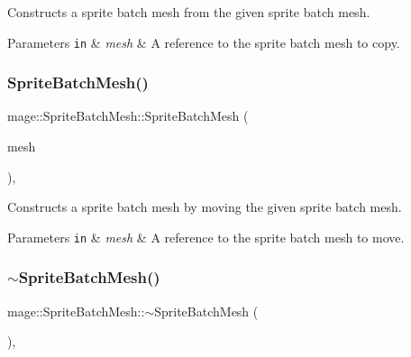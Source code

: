 Constructs a sprite batch mesh from the given sprite batch mesh.


\begin{DoxyParams}[1]{Parameters}
\mbox{\tt in}  & {\em mesh} & A reference to the sprite batch mesh to copy. \\
\hline
\end{DoxyParams}
\hypertarget{classmage_1_1_sprite_batch_mesh_a449601f328db56e11d93e9f4ecb1015b}{}\label{classmage_1_1_sprite_batch_mesh_a449601f328db56e11d93e9f4ecb1015b} 
\subsubsection{\texorpdfstring{Sprite\+Batch\+Mesh()}{SpriteBatchMesh()}\hspace{0.1cm}{\footnotesize\ttfamily [4/4]}}
{\footnotesize\ttfamily mage\+::\+Sprite\+Batch\+Mesh\+::\+Sprite\+Batch\+Mesh (\begin{DoxyParamCaption}\item[{\hyperlink{classmage_1_1_sprite_batch_mesh}{Sprite\+Batch\+Mesh} \&\&}]{mesh }\end{DoxyParamCaption})\hspace{0.3cm}{\ttfamily [default]}, {\ttfamily [noexcept]}}

Constructs a sprite batch mesh by moving the given sprite batch mesh.


\begin{DoxyParams}[1]{Parameters}
\mbox{\tt in}  & {\em mesh} & A reference to the sprite batch mesh to move. \\
\hline
\end{DoxyParams}
\hypertarget{classmage_1_1_sprite_batch_mesh_a4f9ad5d0d58722499b9e7ddfac3312c9}{}\label{classmage_1_1_sprite_batch_mesh_a4f9ad5d0d58722499b9e7ddfac3312c9} 
\subsubsection{\texorpdfstring{$\sim$\+Sprite\+Batch\+Mesh()}{~SpriteBatchMesh()}}
{\footnotesize\ttfamily mage\+::\+Sprite\+Batch\+Mesh\+::$\sim$\+Sprite\+Batch\+Mesh (\begin{DoxyParamCaption}{ }\end{DoxyParamCaption})\hspace{0.3cm}{\ttfamily [virtual]}, {\ttfamily [default]}}

